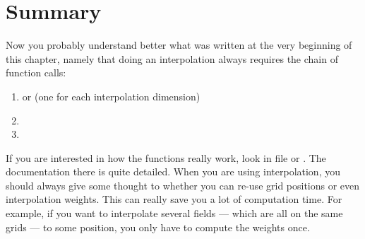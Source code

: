 \section{Summary}

Now you probably understand better what was written at the very
beginning of this chapter, namely that doing an interpolation always
requires the chain of function calls:
\begin{enumerate}
\item {} or  (one for each interpolation dimension)
\item {}
\item {}
\end{enumerate}
If you are interested in how the functions really work, look in file
 or .
The documentation there is quite detailed.  When you are using
interpolation, you should always give some thought to whether you can
re-use grid positions or even interpolation weights. This can really
save you a lot of computation time. For example, if you want to
interpolate several fields --- which are all on the same grids --- to
some position, you only have to compute the weights once.



